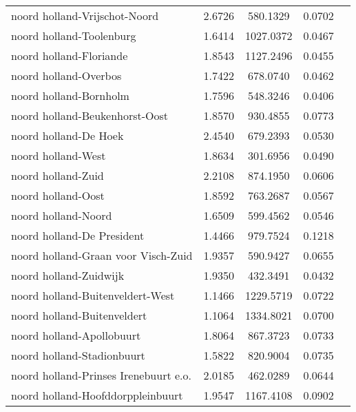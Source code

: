 \begin{longtable}{llccc}
	noord holland-Vrijschot-Noord             & 2.6726  & 580.1329  & 0.0702                 \\
	noord holland-Toolenburg                  & 1.6414  & 1027.0372 & 0.0467                 \\
	noord holland-Floriande                   & 1.8543  & 1127.2496 & 0.0455                 \\
	noord holland-Overbos                     & 1.7422  & 678.0740  & 0.0462                 \\
	noord holland-Bornholm                    & 1.7596  & 548.3246  & 0.0406                 \\
	noord holland-Beukenhorst-Oost            & 1.8570  & 930.4855  & 0.0773                 \\
	noord holland-De Hoek                     & 2.4540  & 679.2393  & 0.0530                 \\
	noord holland-West                        & 1.8634  & 301.6956  & 0.0490                 \\
	noord holland-Zuid                        & 2.2108  & 874.1950  & 0.0606                 \\
	noord holland-Oost                        & 1.8592  & 763.2687  & 0.0567                 \\
	noord holland-Noord                       & 1.6509  & 599.4562  & 0.0546                 \\
	noord holland-De President                & 1.4466  & 979.7524  & 0.1218                 \\
	noord holland-Graan voor Visch-Zuid       & 1.9357  & 590.9427  & 0.0655                 \\
	noord holland-Zuidwijk                    & 1.9350  & 432.3491  & 0.0432                 \\
	noord holland-Buitenveldert-West          & 1.1466  & 1229.5719 & 0.0722                 \\
	noord holland-Buitenveldert               & 1.1064  & 1334.8021 & 0.0700                 \\
	noord holland-Apollobuurt                 & 1.8064  & 867.3723  & 0.0733                 \\
	noord holland-Stadionbuurt                & 1.5822  & 820.9004  & 0.0735                 \\
	noord holland-Prinses Irenebuurt e.o.     & 2.0185  & 462.0289  & 0.0644                 \\
	noord holland-Hoofddorppleinbuurt         & 1.9547  & 1167.4108 & 0.0902                 \\

\end{longtable}
